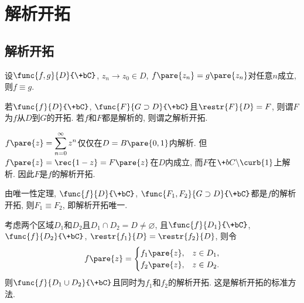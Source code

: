 \documentclass[../ComplexVariable.tex]{subfiles}
\begin{document}
\section{解析开拓} %
\label{sec:解析开拓}

\subsection{解析开拓} %
\label{sub:解析开拓}

\begin{theorem}[唯一性定理]
    设$\func{f,g}{D}{\+bC}$, $z_n\rightarrow z_0\in D$, $f\pare{z_n} = g\pare{z_n}$对任意$n$成立, 则$f\equiv g$.
\end{theorem}
\begin{definition}
    若$\func{f}{D}{\+bC}$, $\func{F}{G\supset D}{\+bC}$且$\restr{F}{D} = F$, 则谓$F$为$f$从$D$到$G$的开拓. 若$f$和$F$都是解析的, 则谓之解析开拓.
\end{definition}
\begin{sample}
    \begin{ex}
        $f\pare{z} = \displaystyle \sum_{n=0}^\infty z^n$仅仅在$D=B\pare{0,1}$内解析. 但$f\pare{z} = \displaystyle \rec{1-z} = F\pare{z}$在$D$内成立, 而$F$在$\+bC\backslash\curb{1}$上解析. 因此$F$是$f$的解析开拓.
    \end{ex}
\end{sample}
\begin{remark}
    由唯一性定理, $\func{f}{D}{\+bC}$, $\func{F_1,F_2}{G\supset D}{\+bC}$都是$f$的解析开拓, 则$F_1\equiv F_2$, 即解析开拓唯一.
\end{remark}
\begin{figure}[ht]
    \centering
    \begin{subfigure}{5cm}
        \centering
    \end{subfigure}
    \begin{subfigure}{5cm}
        \centering
    \end{subfigure}
\end{figure}
考虑两个区域$D_1$和$D_2$且$D_1\cap D_2 = D \neq \varnothing$, 且$\func{f}{D_1}{\+bC}$, $\func{f}{D_2}{\+bC}$, $\restr{f_1}{D} = \restr{f_2}{D}$, 则令
\[ f\pare{z} = \begin{cases}
    f_1\pare{z},& z\in D_1, \\
    f_2\pare{z},& z\in D_2.
\end{cases} \]
则$\func{f}{D_1\cup D_2}{\+bC}$且同时为$f_1$和$f_2$的解析开拓. 这是解析开拓的标准方法.
\end{document}
